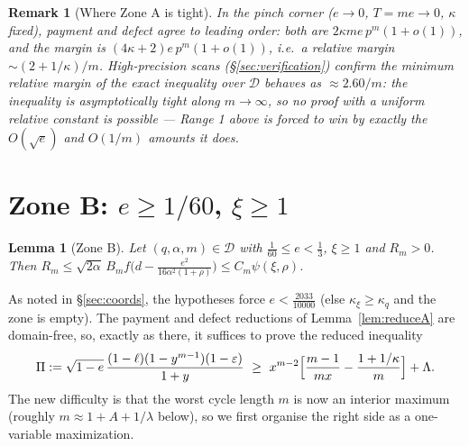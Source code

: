 \documentclass[11pt]{article}
\newtheorem{lemma}[theorem]{Lemma}
\newtheorem{remark}[theorem]{Remark}
\newcommand{\eps}{\varepsilon}
\begin{document}
\begin{remark}[Where Zone A is tight]\label{rmk:zoneA-tight}
In the pinch corner ($e\to0$, $T=me\to0$, $\kappa$ fixed), payment and defect
agree to leading order: both are $2\kappa m e\,p^m(1+o(1))$, and the margin is
$(4\kappa+2)e\,p^m(1+o(1))$, i.e.\ a relative margin $\sim(2+1/\kappa)/m$.
High-precision scans (\S\ref{sec:verification}) confirm the minimum relative
margin of the exact inequality over $\mathcal D$ behaves as $\approx2.60/m$:
the inequality is asymptotically tight along $m\to\infty$, so no proof with a
uniform relative constant is possible --- Range 1 above is forced to win by
exactly the $O(\sqrt e)$ and $O(1/m)$ amounts it does.
\end{remark}

\section{Zone B: $e\ge1/60$, $\xi\ge1$}\label{sec:zoneB}

\begin{lemma}[Zone B]\label{lem:zoneB}
Let $(q,\alpha,m)\in\mathcal D$ with $\tfrac1{60}\le e<\tfrac13$, $\xi\ge1$
and $R_m>0$.  Then
$R_m\le\sqrt{2\alpha}\,B_mf\bigl(d-\frac{e^2}{16\alpha^2(1+\rho)}\bigr)
\le C_m\psi(\xi,\rho)$.
\end{lemma}

As noted in \S\ref{sec:coords}, the hypotheses force $e<\tfrac{2033}{10000}$
(else $\kappa_\xi\ge\kappa_q$ and the zone is empty).  The payment and defect
reductions of Lemma~\ref{lem:reduceA} are domain-free, so, exactly as there,
it suffices to prove the reduced inequality
\begin{equation}\label{eq:reducedB}
        \Pi:=\sqrt{1-e}\,\frac{(1-\ell)(1-y^{m-1})(1-\eps)}{1+y}
        \ \ge\ x^{m-2}\Bigl[\frac{m-1}{mx}-\frac{1+1/\kappa}{m}\Bigr]+\Lambda .
\end{equation}
The new difficulty is that the worst cycle length $m$ is now an interior
maximum (roughly $m\approx1+A+1/\lambda$ below), so we first organise the
right side as a one-variable maximization.
\end{document}
